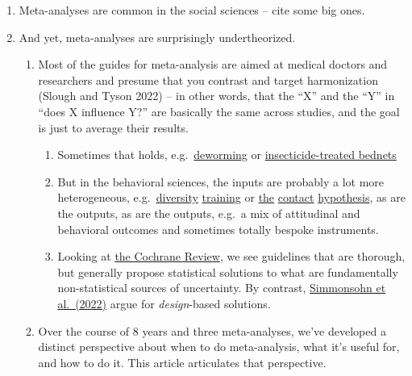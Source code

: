 \documentclass[
  man]{apa6}
\providecommand{\tightlist}{%
  \setlength{\itemsep}{0pt}\setlength{\parskip}{0pt}}
\begin{document}
\begin{enumerate}
\def\labelenumi{\arabic{enumi}.}
\tightlist
\item
  Meta-analyses are common in the social sciences -- cite some big ones.
\item
  And yet, meta-analyses are surprisingly undertheorized.

  \begin{enumerate}
  \def\labelenumii{\arabic{enumii}.}
  \tightlist
  \item
    Most of the guides for meta-analysis are aimed at medical doctors and researchers and presume that you contrast and target harmonization (Slough and Tyson 2022) -- in other words, that the ``X'' and the ``Y'' in ``does X influence Y?'' are basically the same across studies, and the goal is just to average their results.

    \begin{enumerate}
    \def\labelenumiii{\arabic{enumiii}.}
    \tightlist
    \item
      Sometimes that holds, e.g.~\href{https://scholar.harvard.edu/files/kremer/files/meta-analysis_deworming_world_bank_working_paper_dec_2016.pdf}{deworming} or \href{https://www.mmv.org/sites/default/files/uploads/docs/access/SMC_Tool_Kit/publications/Meremikww-ipt-review.pdf}{insecticide-treated bednets}
    \item
      But in the behavioral sciences, the inputs are probably a lot more heterogeneous, e.g.~\href{https://psycnet.apa.org/record/2016-43598-001}{diversity} \href{https://compass.onlinelibrary.wiley.com/doi/10.1111/spc3.12741?af=R}{training} or \href{https://pubmed.ncbi.nlm.nih.gov/16737372/}{the} \href{https://psycnet.apa.org/record/2015-07056-001}{contact} \href{https://journals.sagepub.com/doi/abs/10.1177/1088868318762647}{hypothesis}, as are the outputs, as are the outputs, e.g.~a mix of attitudinal and behavioral outcomes and sometimes totally bespoke instruments.
    \item
      Looking at \href{https://training.cochrane.org/handbook/current/chapter-10}{the Cochrane Review}, we see guidelines that are thorough, but generally propose statistical solutions to what are fundamentally non-statistical sources of uncertainty. By contrast, \href{https://www.nature.com/articles/s44159-022-00101-8}{Simmonsohn et al.~(2022)} argue for \emph{design}-based solutions.
    \end{enumerate}
  \item
    Over the course of 8 years and three meta-analyses, we've developed a distinct perspective about when to do meta-analysis, what it's useful for, and how to do it. This article articulates that perspective.


\end{enumerate}
\end{enumerate}
\end{document}
